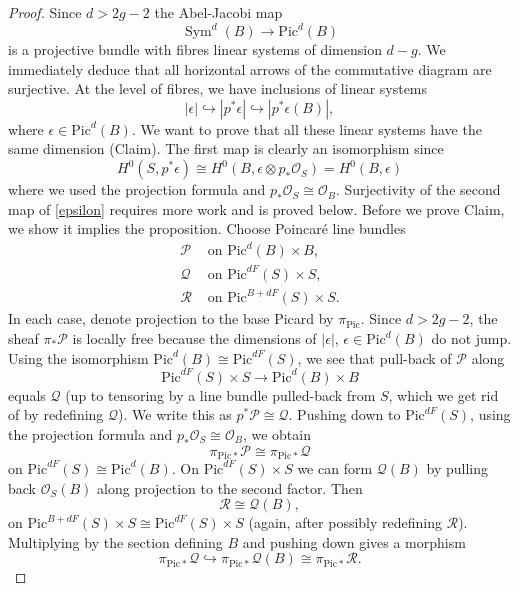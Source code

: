\documentclass{amsart}
\theoremstyle{definition}
\renewcommand{\O}{\mathcal{O}}
\newcommand{\Pic}{\mathrm{Pic}}
\newcommand{\Sym}{\operatorname{Sym}}
\newcommand{\cP}{\mathcal{P}}
\newcommand{\cQ}{\mathcal{Q}}
\newcommand{\cR}{\mathcal{R}}
\begin{document}
\begin{proof}
Since $d > 2g-2$ the Abel-Jacobi map 
$$
\Sym^d(B) \rightarrow \Pic^d(B)
$$
is a projective bundle with fibres linear systems of dimension $d-g$. We immediately deduce that all horizontal arrows of the commutative diagram are surjective. At the level of fibres, we have inclusions of linear systems
\begin{equation} \label{epsilon}
|\epsilon| \hookrightarrow |p^* \epsilon| \hookrightarrow |p^* \epsilon (B)|,
\end{equation}
where $\epsilon \in \Pic^d(B)$. We want to prove that all these linear systems have the same dimension (Claim). The first map is clearly an isomorphism since
$$
H^0(S,p^* \epsilon) \cong H^0(B, \epsilon \otimes p_* \O_S) = H^0(B,\epsilon)
$$
where we used the projection formula and $p_* \O_S \cong \O_B$. Surjectivity of the second map of \eqref{epsilon} requires more work and is proved below. Before we prove Claim, we show it implies the proposition. Choose Poincar\'e line bundles 
\begin{align*}
\cP &\textrm{ \ on \ } \Pic^d(B) \times B, \\
\cQ &\textrm{ \ on \ } \Pic^{dF}(S) \times S, \\
\cR &\textrm{ \ on \ } \Pic^{B+dF}(S) \times S.
\end{align*}
In each case, denote projection to the base Picard by $\pi_{\Pic}$. Since $d > 2g-2$, the sheaf $\pi_* \mathcal{P}$ is locally free because the dimensions of $|\epsilon|$, $\epsilon \in \Pic^d(B)$ do not jump. Using the isomorphism $\Pic^d(B) \cong \Pic^{dF}(S)$, we see that pull-back of $\mathcal{P}$ along 
$$
\Pic^{dF}(S) \times S \rightarrow \Pic^d(B) \times B
$$
equals $\mathcal{Q}$ (up to tensoring by a line bundle pulled-back from $S$, which we get rid of by redefining $\mathcal{Q}$). We write this as $p^* \mathcal{P} \cong \mathcal{Q}$. Pushing down to $\Pic^{dF}(S)$, using the projection formula and $p_* \O_S \cong \O_B$, we obtain
$$
\pi_{\Pic *} \cP \cong \pi_{\Pic *} \cQ
$$
on $\Pic^{dF}(S) \cong \Pic^{d}(B)$. On $\Pic^{dF}(S) \times S$ we can form $\cQ(B)$ by pulling back $\O_S(B)$ along projection to the second factor. Then
$$
\cR \cong \cQ(B),
$$
on $\Pic^{B+dF}(S) \times S \cong \Pic^{dF}(S) \times S$ (again, after possibly redefining $\cR$). Multiplying by the section defining $B$ and pushing down gives a morphism
\begin{equation} \label{vbmap}
\pi_{\Pic *} \cQ \hookrightarrow \pi_{\Pic *} \cQ(B) \cong \pi_{\Pic *} \cR.
\end{equation}

\end{proof}
\end{document}
